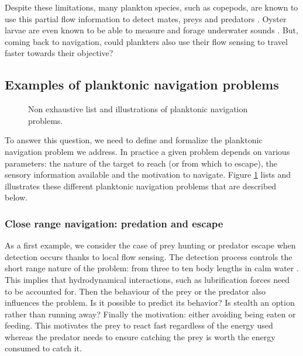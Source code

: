 Despite these limitations, many plankton species, such as copepods, are known to use this partial flow information to detect mates, preys and predators \citep{kiorboe1999predator, kiorboe1999hydrodynamic, jiang2002hydrodynamic}.
Oyster larvae are even known to be able to measure and forage underwater sounds \citep{williams2022oyster}. 
But, coming back to navigation, could plankters also use their flow sensing to travel faster towards their objective?

\subsection{Examples of planktonic navigation problems}

\begin{figure}
	\centering
	\def\svgwidth{0.9\textwidth}
	
  	\caption{
  		Non exhaustive list and illustrations of planktonic navigation problems.
  	}
  	\label{fig:planktonic_navigation_problems}
\end{figure}
To answer this question, we need to define and formalize the planktonic navigation problem we address.
In practice a given problem depends on various parameters: the nature of the target to reach (or from which to escape), the sensory information available and the motivation to navigate.
Figure \ref{fig:planktonic_navigation_problems} lists and illustrates these different planktonic navigation problems that are described below.

\subsubsection{Close range navigation: predation and escape}

As a first example, we consider the case of prey hunting or predator escape when detection occurs thanks to local flow sensing.
The detection process controls the short range nature of the problem: from three to ten body lengths in calm water \citep{fields2010orientation}. 
This implies that hydrodynamical interactions, such as lubrification forces need to be accounted for.
Then the behaviour of the prey or the predator also influences the problem. 
Is it possible to predict its behavior? 
Is stealth an option rather than running away?
Finally the motivation: either avoiding being eaten or feeding. 
This motivates the prey to react fast regardless of the energy used whereas the predator needs to ensure catching the prey is worth the energy consumed to catch it.

